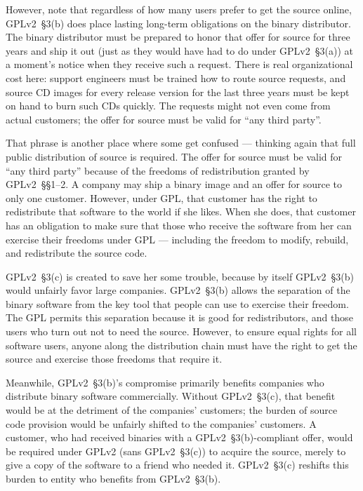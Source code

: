 However, note that regardless of how many users prefer to get the
source online, GPLv2~\S3(b) does place lasting long-term obligations on the
binary distributor.  The binary distributor must be prepared to honor
that offer for source for three years and ship it out (just as they
would have had to do under GPLv2~\S3(a)) at a moment's notice when they
receive such a request.  There is real organizational cost here:
support engineers must be trained how to route source requests, and
source CD images for every release version for the last three years
must be kept on hand to burn such CDs quickly. The requests might not
even come from actual customers; the offer for source must be valid
for ``any third party''.

That phrase is another place where some get confused --- thinking again
that full public distribution of source is required.  The offer for source
must be valid for ``any third party'' because of the freedoms of
redistribution granted by GPLv2~\S\S1--2.  A company may ship a binary image
and an offer for source to only one customer.  However, under GPL, that
customer has the right to redistribute that software to the world if she
likes.  When she does, that customer has an obligation to make sure that
those who receive the software from her can exercise their freedoms under
GPL --- including the freedom to modify, rebuild, and redistribute the
source code.

GPLv2~\S3(c) is created to save her some trouble, because by itself GPLv2~\S3(b)
would unfairly favor large companies.  GPLv2~\S3(b) allows the
separation of the binary software from the key tool that people can use
to exercise their freedom. The GPL permits this separation because it is
good for redistributors, and those users who turn out not to need the
source.  However, to ensure equal rights for all software users, anyone
along the distribution chain must have the right to get the source and
exercise those freedoms that require it.

Meanwhile, GPLv2~\S3(b)'s compromise primarily benefits companies who
distribute binary software commercially.  Without GPLv2~\S3(c), that benefit
would be at the detriment of the companies' customers; the burden of
source code provision would be unfairly shifted to the companies'
customers.  A customer, who had received binaries with a GPLv2~\S3(b)-compliant
offer, would be required under GPLv2 (sans GPLv2~\S3(c)) to acquire the source,
merely to give a copy of the software to a friend who needed it.  GPLv2~\S3(c)
reshifts this burden to entity who benefits from GPLv2~\S3(b).

